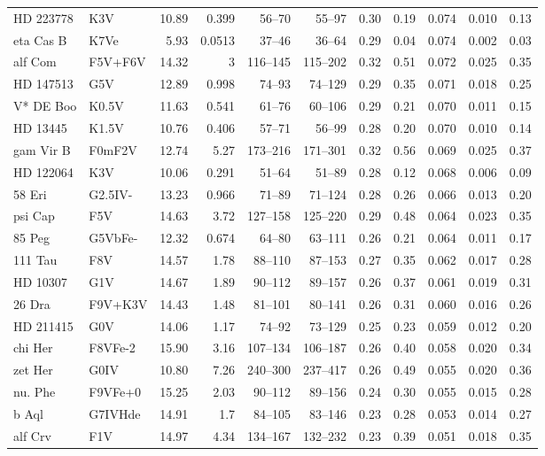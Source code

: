 \documentclass[11pt,a4paper]{article}
\begin{document}
{\begin{longtable}{llrrrrrrrrr}
HD 223778 & K3V & 10.89 & 0.399 & 56--70 & 55--97 & 0.30 & 0.19 & 0.074 & 0.010 & 0.13 \\
eta Cas B & K7Ve & 5.93 & 0.0513 & 37--46 & 36--64 & 0.29 & 0.04 & 0.074 & 0.002 & 0.03 \\
alf Com & F5V+F6V & 14.32 & 3 & 116--145 & 115--202 & 0.32 & 0.51 & 0.072 & 0.025 & 0.35 \\
HD 147513 & G5V & 12.89 & 0.998 & 74--93 & 74--129 & 0.29 & 0.35 & 0.071 & 0.018 & 0.25 \\
V* DE Boo & K0.5V & 11.63 & 0.541 & 61--76 & 60--106 & 0.29 & 0.21 & 0.070 & 0.011 & 0.15 \\
HD  13445 & K1.5V & 10.76 & 0.406 & 57--71 & 56--99 & 0.28 & 0.20 & 0.070 & 0.010 & 0.14 \\
gam Vir B & F0mF2V & 12.74 & 5.27 & 173--216 & 171--301 & 0.32 & 0.56 & 0.069 & 0.025 & 0.37 \\
HD 122064 & K3V & 10.06 & 0.291 & 51--64 & 51--89 & 0.28 & 0.12 & 0.068 & 0.006 & 0.09 \\
58 Eri & G2.5IV- & 13.23 & 0.966 & 71--89 & 71--124 & 0.28 & 0.26 & 0.066 & 0.013 & 0.20 \\
psi Cap & F5V & 14.63 & 3.72 & 127--158 & 125--220 & 0.29 & 0.48 & 0.064 & 0.023 & 0.35 \\
85 Peg & G5VbFe- & 12.32 & 0.674 & 64--80 & 63--111 & 0.26 & 0.21 & 0.064 & 0.011 & 0.17 \\
111 Tau & F8V & 14.57 & 1.78 & 88--110 & 87--153 & 0.27 & 0.35 & 0.062 & 0.017 & 0.28 \\
HD  10307 & G1V & 14.67 & 1.89 & 90--112 & 89--157 & 0.26 & 0.37 & 0.061 & 0.019 & 0.31 \\
26 Dra & F9V+K3V & 14.43 & 1.48 & 81--101 & 80--141 & 0.26 & 0.31 & 0.060 & 0.016 & 0.26 \\
HD 211415 & G0V & 14.06 & 1.17 & 74--92 & 73--129 & 0.25 & 0.23 & 0.059 & 0.012 & 0.20 \\
chi Her & F8VFe-2 & 15.90 & 3.16 & 107--134 & 106--187 & 0.26 & 0.40 & 0.058 & 0.020 & 0.34 \\
zet Her & G0IV & 10.80 & 7.26 & 240--300 & 237--417 & 0.26 & 0.49 & 0.055 & 0.020 & 0.36 \\
nu. Phe & F9VFe+0 & 15.25 & 2.03 & 90--112 & 89--156 & 0.24 & 0.30 & 0.055 & 0.015 & 0.28 \\
b Aql & G7IVHde & 14.91 & 1.7 & 84--105 & 83--146 & 0.23 & 0.28 & 0.053 & 0.014 & 0.27 \\
alf Crv & F1V & 14.97 & 4.34 & 134--167 & 132--232 & 0.23 & 0.39 & 0.051 & 0.018 & 0.35 \\

\end{longtable}}
\end{document}
